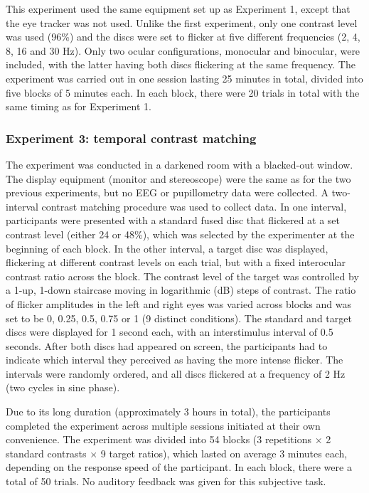\documentclass[
]{article}
\begin{document}
This experiment used the same equipment set up as Experiment 1, except that the eye tracker was not used. Unlike the first experiment, only one contrast level was used (96\%) and the discs were set to flicker at five different frequencies (2, 4, 8, 16 and 30 Hz). Only two ocular configurations, monocular and binocular, were included, with the latter having both discs flickering at the same frequency. The experiment was carried out in one session lasting 25 minutes in total, divided into five blocks of 5 minutes each. In each block, there were 20 trials in total with the same timing as for Experiment 1.

\hypertarget{experiment-3-temporal-contrast-matching}{%
\subsubsection{Experiment 3: temporal contrast matching}\label{experiment-3-temporal-contrast-matching}}

The experiment was conducted in a darkened room with a blacked-out window. The display equipment (monitor and stereoscope) were the same as for the two previous experiments, but no EEG or pupillometry data were collected. A two-interval contrast matching procedure was used to collect data. In one interval, participants were presented with a standard fused disc that flickered at a set contrast level (either 24 or 48\%), which was selected by the experimenter at the beginning of each block. In the other interval, a target disc was displayed, flickering at different contrast levels on each trial, but with a fixed interocular contrast ratio across the block. The contrast level of the target was controlled by a 1-up, 1-down staircase moving in logarithmic (dB) steps of contrast. The ratio of flicker amplitudes in the left and right eyes was varied across blocks and was set to be 0, 0.25, 0.5, 0.75 or 1 (9 distinct conditions). The standard and target discs were displayed for 1 second each, with an interstimulus interval of 0.5 seconds. After both discs had appeared on screen, the participants had to indicate which interval they perceived as having the more intense flicker. The intervals were randomly ordered, and all discs flickered at a frequency of 2 Hz (two cycles in sine phase).

Due to its long duration (approximately 3 hours in total), the participants completed the experiment across multiple sessions initiated at their own convenience. The experiment was divided into 54 blocks (3 repetitions \(\times\) 2 standard contrasts \(\times\) 9 target ratios), which lasted on average 3 minutes each, depending on the response speed of the participant. In each block, there were a total of 50 trials. No auditory feedback was given for this subjective task.
\end{document}
